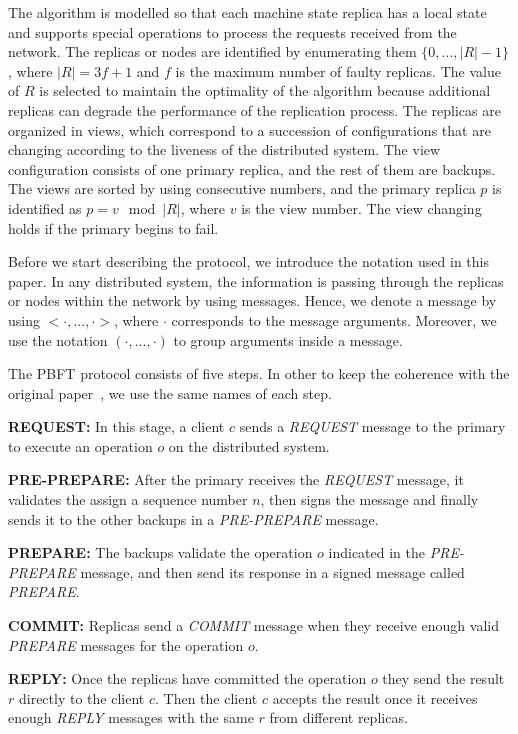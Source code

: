 \documentclass[conference]{IEEEtran}
\begin{document}
The algorithm is modelled so that each machine state replica has a local state and supports special operations to process the requests received from the network. The replicas or nodes are identified by enumerating them $\{0,...,\lvert R\rvert-1\}$, where $\lvert R\rvert=3f+1$ and $f$ is the maximum number of faulty replicas. The value of $R$ is selected to maintain the optimality of the algorithm because additional replicas can degrade the performance of the replication process. The replicas are organized in views, which correspond to a succession of configurations that are changing according to the liveness of the distributed system. The view configuration consists of one primary replica, and the rest of them are backups. The views are sorted by using consecutive numbers, and the primary replica $p$ is identified as $p=v\mod \lvert R\rvert$, where $v$ is the view number. The view changing holds if the primary begins to fail.

Before we start describing the protocol, we introduce the notation used in this paper. In any distributed system, the information is passing through the replicas or nodes within the network by using messages. Hence, we  denote a message by using $<\cdot,...,\cdot>$, where $\cdot$ corresponds to the message arguments. Moreover, we use the notation $(\cdot,...,\cdot)$ to group arguments inside a message.

The PBFT protocol consists of five steps. In other to keep the coherence with the original paper~\cite{castro1999practical}, we  use the same names of each step.

\begin{compactenum}
    \item \textbf{REQUEST:} In this stage, a client $c$ sends a \textit{REQUEST} message to the primary to execute an operation $o$ on the distributed system.
    \item \textbf{PRE-PREPARE:} After the primary receives the \textit{REQUEST} message, it validates the assign a sequence number $n$, then signs the message and finally sends it to the other backups in a \textit{PRE-PREPARE} message.
    \item \textbf{PREPARE:} The backups validate the operation $o$ indicated in the \textit{PRE-PREPARE} message, and then send its response in a signed message called \textit{PREPARE}.
    \item \textbf{COMMIT:} Replicas  send a \textit{COMMIT} message when they receive enough valid \textit{PREPARE} messages for the operation $o$.
    \item \textbf{REPLY:} Once the replicas have committed the operation $o$ they  send the result $r$ directly to the client $c$. Then the client $c$ accepts the result once it receives enough \textit{REPLY} messages with the same $r$ from different replicas.
\end{compactenum}
\end{document}
